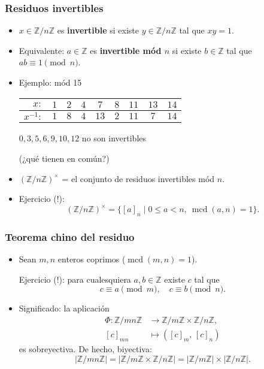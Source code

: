 \documentclass[handout]{beamer}
\newcommand{\ZZ}{\mathbb{Z}}
\DeclareMathOperator{\mcd}{mcd}
\begin{document}

\begin{frame}
  \frametitle{Residuos invertibles}

  \begin{itemize}
  \item<2-> $x \in \ZZ/n\ZZ$ es \textbf{invertible} si existe $y \in \ZZ/n\ZZ$ tal
    que $xy = 1$.

  \item<3-> Equivalente: $a \in \ZZ$ es \textbf{invertible mód $n$} si existe
    $b \in \ZZ$ tal que $ab \equiv 1 \pmod{n}$.

  \item<4-> Ejemplo: mód 15
    \begin{center}
      \begin{tabular}{rcccccccc}
        \hline
        $x\colon$ & $1$ & $2$ & $4$ & $7$ & $8$ & $11$ & $13$ & $14$ \\
        \hline
        $x^{-1}\colon$ & $1$ & $8$ & $4$ & $13$ & $2$ & $11$ & $7$ & $14$ \\
        \hline
      \end{tabular}
    \end{center}

    $0, 3, 5, 6, 9, 10, 12$ no son invertibles

    (¿qué tienen en común?)

  \item<5-> $(\ZZ/n\ZZ)^\times$ = el conjunto de residuos invertibles mód $n$.

  \item<6-> Ejercicio (!):
    $$(\ZZ/n\ZZ)^\times = \{ [a]_n \mid 0 \le a < n, ~ \mcd (a,n) = 1 \}.$$
  \end{itemize}
\end{frame}


\begin{frame}
  \frametitle{Teorema chino del residuo}

  \begin{itemize}
  \item<2-> Sean $m,n$ enteros coprimos ($\mcd (m,n) = 1$).

    Ejercicio (!): para cualesquiera $a,b \in \ZZ$ existe $c$ tal que
    $$c \equiv a \pmod{m}, \quad c \equiv b \pmod{n}.$$

  \item<3-> Significado: la aplicación
    \begin{align*}
      \Phi\colon \ZZ/mn\ZZ & \to \ZZ/m\ZZ \times \ZZ/n\ZZ,\\
      [c]_{mn} & \mapsto ([c]_m, \, [c]_n)
    \end{align*}
    es sobreyectiva. De hecho, biyectiva:
    $$|\ZZ/mn\ZZ| = |\ZZ/m\ZZ \times \ZZ/n\ZZ| = |\ZZ/m\ZZ| \times |\ZZ/n\ZZ|.$$
  \end{itemize}
\end{frame}
\end{document}
